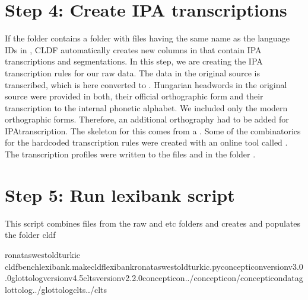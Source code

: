 \documentclass[letterpaper,10pt,english]{sphinxmanual}
\begin{document}
\section{Step 4: Create IPA transcriptions}
\label{\detokenize{mkcldf:step-4-create-ipa-transcriptions}}
\sphinxAtStartPar
If the folder  contains a folder  with files having the
same
name as the language IDs in , CLDF automatically creates
new columns in  that contain
IPA transcriptions and segmentations. In this step, we are creating the
IPA transcription rules for our raw data. The data in the original source
is 
\sphinxhyphen{}transcribed, which is here converted to .
Hungarian
headwords in the original source were provided in both, their official
orthographic form and their transcription to the internal
phonetic alphabet. We included only the modern orthographic forms.
Therefore, an additional orthography had to be added for IPA\sphinxhyphen{}transcription.
The skeleton for this comes from a .
Some of the combinatorics for the hard\sphinxhyphen{}coded transcription rules were created
with an online tool called . The transcription profiles were
written to the files     and
 in the folder .


\section{Step 5: Run lexibank script}
\label{\detokenize{mkcldf:step-5-run-lexibank-script}}
\sphinxAtStartPar
This script combines files from the raw and etc folders and creates and
populates the folder cldf

\begin{sphinxVerbatim}[commandchars=\\\{\}]
ronataswestoldturkic
cldfbenchlexibank.makecldflexibank\PYGZus{}ronataswestoldturkic.py\PYGZhy{}\PYGZhy{}concepticon\PYGZhy{}versionv3.0.0\PYGZhy{}\PYGZhy{}glottolog\PYGZhy{}versionv4.5\PYGZhy{}\PYGZhy{}clts\PYGZhy{}versionv2.2.0\PYGZhy{}\PYGZhy{}concepticon../concepticon/concepticon\PYGZhy{}data\PYGZhy{}\PYGZhy{}glottolog../glottolog\PYGZhy{}\PYGZhy{}clts../clts
\end{sphinxVerbatim}
\end{document}
